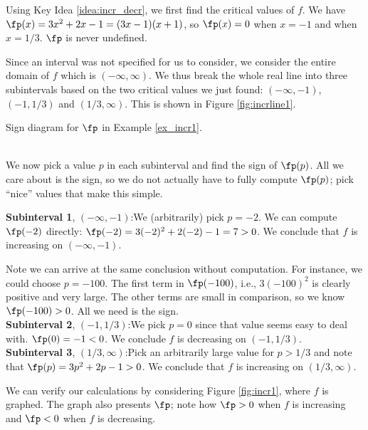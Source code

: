 {Using Key Idea \ref{idea:incr_decr}, we first find the critical values of $f$. We have $\fp(x) = 3x^2+2x-1 = (3x-1)(x+1)$, so $\fp(x) = 0$ when $x=-1$ and when $x=1/3$. $\fp$ is never undefined.

Since an interval was not specified for us to consider, we consider the entire domain of $f$ which is $(-\infty,\infty)$. We thus break the whole real line into three subintervals based on the two critical values we just found: $(-\infty,-1)$, $(-1,1/3)$ and $(1/3,\infty)$. This is shown in Figure \ref{fig:incrline1}.\\

\noindent\begin{minipage}{\textwidth}\centering
{}
\captionsetup{type=figure}%
\caption{Sign diagram for $\fp$ in Example \ref{ex_incr1}.}\label{fig:incrline1}
\end{minipage}\\

We now pick a value $p$ in each subinterval and find the sign of $\fp(p)$. All we care about is the sign, so we do not actually have to fully compute $\fp(p)$; pick ``nice'' values that make this simple.

\noindent\textbf{Subinterval 1}, $(-\infty,-1)$:\quad We (arbitrarily) pick $p=-2$. We can compute $\fp(-2)$ directly: $\fp(-2) = 3(-2)^2+2(-2)-1=7>0$. We conclude that $f$ is increasing on $(-\infty,-1)$.

Note we can arrive at the same conclusion without computation. For instance, we could choose $p=-100$. The first term in $\fp(-100)$, i.e., $3(-100)^2$ is clearly positive and very large. The other terms are small in comparison, so we know $\fp(-100)>0$. All we need is the sign.\\

\noindent\textbf{Subinterval 2}, $(-1,1/3)$:\quad We pick $p=0$ since that value seems easy to deal with. $\fp(0) = -1<0$. We conclude $f$ is decreasing on $(-1,1/3)$.\\

\noindent\textbf{Subinterval 3}, $(1/3,\infty)$:\quad Pick an arbitrarily large value for $p>1/3$ and note that $\fp(p) =3p^2+2p-1 >0$. We conclude that $f$ is increasing on $(1/3,\infty)$.

We can verify our calculations by considering Figure \ref{fig:incr1}, where $f$ is graphed. The graph also presents $\fp$; note how $\fp>0$ when $f$ is increasing and $\fp<0$ when $f$ is decreasing.
}\\

